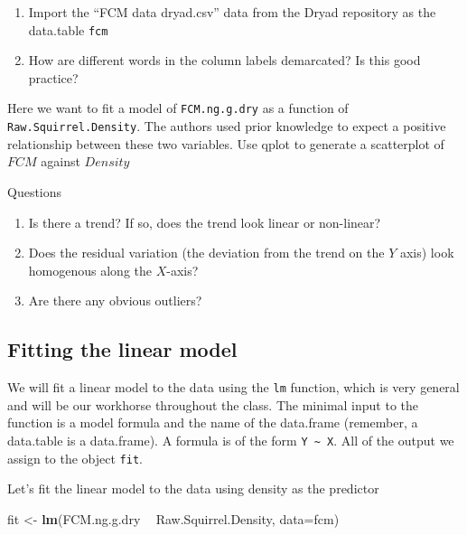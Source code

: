 \documentclass[]{book}
\newenvironment{Shaded}{\begin{snugshade}}{\end{snugshade}}
\newcommand{\KeywordTok}[1]{\textcolor[rgb]{0.13,0.29,0.53}{\textbf{#1}}}
\newcommand{\DataTypeTok}[1]{\textcolor[rgb]{0.13,0.29,0.53}{#1}}
\newcommand{\StringTok}[1]{\textcolor[rgb]{0.31,0.60,0.02}{#1}}
\newcommand{\OperatorTok}[1]{\textcolor[rgb]{0.81,0.36,0.00}{\textbf{#1}}}
\newcommand{\NormalTok}[1]{#1}
\providecommand{\tightlist}{%
  \setlength{\itemsep}{0pt}\setlength{\parskip}{0pt}}
\begin{document}
\begin{enumerate}
\def\labelenumi{\arabic{enumi}.}
\tightlist
\item
  Import the ``FCM data dryad.csv'' data from the Dryad repository as
  the data.table \texttt{fcm}
\item
  How are different words in the column labels demarcated? Is this good
  practice?
\end{enumerate}

Here we want to fit a model of \texttt{FCM.ng.g.dry} as a function of
\texttt{Raw.Squirrel.Density}. The authors used prior knowledge to
expect a positive relationship between these two variables. Use qplot to
generate a scatterplot of \(FCM\) against \(Density\)

Questions

\begin{enumerate}
\def\labelenumi{\arabic{enumi}.}
\setcounter{enumi}{2}
\tightlist
\item
  Is there a trend? If so, does the trend look linear or non-linear?
\item
  Does the residual variation (the deviation from the trend on the \(Y\)
  axis) look homogenous along the \(X\)-axis?
\item
  Are there any obvious outliers?
\end{enumerate}

\subsection{Fitting the linear model}\label{fitting-the-linear-model}

We will fit a linear model to the data using the \texttt{lm} function,
which is very general and will be our workhorse throughout the class.
The minimal input to the function is a model formula and the name of the
data.frame (remember, a data.table is a data.frame). A formula is of the
form \texttt{Y\ \textasciitilde{}\ X}. All of the output we assign to
the object \texttt{fit}.

Let's fit the linear model to the data using density as the predictor

\begin{Shaded}
\begin{Highlighting}[]
\NormalTok{  fit <-}\StringTok{ }\KeywordTok{lm}\NormalTok{(FCM.ng.g.dry }\OperatorTok{~}\StringTok{ }\NormalTok{Raw.Squirrel.Density, }\DataTypeTok{data=}\NormalTok{fcm)}
\end{Highlighting}
\end{Shaded}
\end{document}
